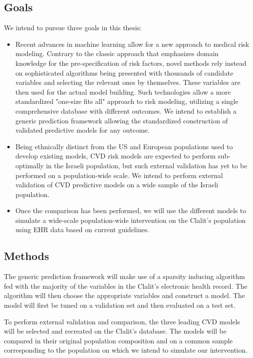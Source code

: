 \documentclass[a4paper,12pt]{article}
\begin{document}
		\subsection{Goals}
		We intend to pursue three goals in this thesis:
		\begin{itemize}
			\item Recent advances in machine learning allow for a new approach to medical risk modeling\cite{Obermeyer2016}. Contrary to the classic approach that emphasizes domain knowledge for the pre-specification of risk factors, novel methods rely instead on sophisticated algorithms being presented with thousands of candidate variables and selecting the relevant ones by themselves. These variables are then used for the actual model building\cite{Weng2017}. Such technologies allow a more standardized "one-size fits all" approach to risk modeling, utilizing a single comprehensive database with different outcomes\cite{Rajkomar2018}. We intend to establish a generic prediction framework allowing the standardized construction of validated predictive models for any outcome.
			\item Being ethnically distinct from the US and European populations used to develop existing models, CVD risk models are expected to perform sub-optimally in the Israeli population, but such external validation has yet to be performed on a population-wide scale\cite{Lovis2015}. We intend to perform external validation of CVD predictive models on a wide sample of the Israeli population.
			\item Once the comparison has been performed, we will use the different models to simulate a wide-scale population-wide intervention on the Clalit's population using EHR data based on current guidelines\cite{Goff2014}.
		\end{itemize}
	
		\subsection{Methods}
		The generic prediction framework will make use of a sparsity inducing algorithm fed with the majority of the variables in the Clalit's electronic health record. The algorithm will then choose the appropriate variables and construct a model. The model will first be tuned on a validation set and then evaluated on a test set.
		
		To perform external validation and comparison, the three leading CVD models will be selected and recreated on the Clalit's database. The models will be compared in their original population composition and on a common sample corresponding to the population on which we intend to simulate our intervention.
		
\end{document}
